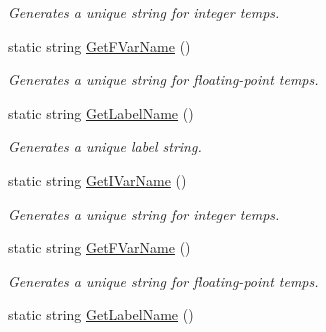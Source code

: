 \begin{DoxyCompactItemize}
\begin{DoxyCompactList}\small\item\em Generates a unique string for integer temps. \end{DoxyCompactList}\item 
\hypertarget{classTAC__Generator_a1765369ef41d28a615bf3c50aded0319}{static string \hyperlink{classTAC__Generator_a1765369ef41d28a615bf3c50aded0319}{Get\-F\-Var\-Name} ()}\label{classTAC__Generator_a1765369ef41d28a615bf3c50aded0319}

\begin{DoxyCompactList}\small\item\em Generates a unique string for floating-\/point temps. \end{DoxyCompactList}\item 
\hypertarget{classTAC__Generator_a0d4dd38bfaa1a28fc615b81cbfd4efa1}{static string \hyperlink{classTAC__Generator_a0d4dd38bfaa1a28fc615b81cbfd4efa1}{Get\-Label\-Name} ()}\label{classTAC__Generator_a0d4dd38bfaa1a28fc615b81cbfd4efa1}

\begin{DoxyCompactList}\small\item\em Generates a unique label string. \end{DoxyCompactList}\item 
\hypertarget{classTAC__Generator_a7a604278c753cac6332ed772de9f12ea}{static string \hyperlink{classTAC__Generator_a7a604278c753cac6332ed772de9f12ea}{Get\-I\-Var\-Name} ()}\label{classTAC__Generator_a7a604278c753cac6332ed772de9f12ea}

\begin{DoxyCompactList}\small\item\em Generates a unique string for integer temps. \end{DoxyCompactList}\item 
\hypertarget{classTAC__Generator_a1765369ef41d28a615bf3c50aded0319}{static string \hyperlink{classTAC__Generator_a1765369ef41d28a615bf3c50aded0319}{Get\-F\-Var\-Name} ()}\label{classTAC__Generator_a1765369ef41d28a615bf3c50aded0319}

\begin{DoxyCompactList}\small\item\em Generates a unique string for floating-\/point temps. \end{DoxyCompactList}\item 
\hypertarget{classTAC__Generator_a0d4dd38bfaa1a28fc615b81cbfd4efa1}{static string \hyperlink{classTAC__Generator_a0d4dd38bfaa1a28fc615b81cbfd4efa1}{Get\-Label\-Name} ()}\label{classTAC__Generator_a0d4dd38bfaa1a28fc615b81cbfd4efa1}


\end{DoxyCompactItemize}

